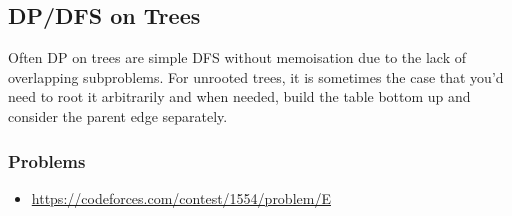 \subsection*{DP/DFS on Trees}
Often DP on trees are simple DFS without memoisation due to the lack of overlapping subproblems. For unrooted trees, it is sometimes the case that you'd need to root it arbitrarily and when needed, build the table bottom up and consider the parent edge separately.

\subsubsection*{Problems}
\begin{itemize}
\item  \url{https://codeforces.com/contest/1554/problem/E}
\end{itemize}